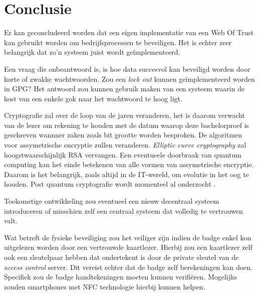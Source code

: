 
\chapter{Conclusie}
\label{ch:conclusie}


Er kan geconcludeerd worden dat een eigen implementatie van een Web Of Trust kan
gebruikt worden om bedrijfsprocessen te beveiligen. Het is echter zeer
belangrijk dat zo'n systeem juist wordt geïmplementeerd.

Een vraag die onbeantwoord is, is hoe data succesvol kan beveiligd worden door
korte of zwakke wachtwoorden. Zou een \textit{lock out} kunnen geïmplementeerd
worden in \gls{GPG}? Het antwoord zou kunnen gebruik maken van een systeem
waarin de kost van een enkele gok naar het wachtwoord te hoog ligt.

Cryptografie zal over de loop van de jaren veranderen, het is daarom verwacht
van de lezer om rekening te houden met de datum waarop deze bachelorproef is
geschreven wannner zaken zoals bit grootte worden besproken. De algoritmen voor
assymetrische encryptie zullen veranderen. \textit{Elliptic curve cryptography}
zal hoogstwaarschijnlijk RSA vervangen. Een eventueele doorbraak van quantum
computing kan het einde betekenen van alle vormen van assymetrische encryptie.
Daarom is het belangrijk, zoals altijd in de IT-wereld, om evolutie in het oog
te houden. Post quantum cryptografie wordt momenteel al onderzocht
\autocite{ANewHopeUsenix}.

Toekomstige ontwikkeling zou eventueel een nieuw decentraal systeem introduceren
of misschien zelf een centraal systeem dat volledig te vertrouwen valt.

Wat betreft de fysieke beveiliging zou het veiliger zijn indien de badge enkel
kon uitgelezen worden door een vertrouwde kaartlezer. Hierbij zou een kaartlezer
zelf ook een sleutelpaar hebben dat ondertekent is door de private sleutel van
de \textit{access control} server. Dit vereist echter dat de badge zelf
berekeningen kan doen. Specifiek zou de badge handtekeningen moeten kunnen
verifiëren. Mogelijks zouden smartphones met NFC technologie hierbij kunnen
helpen.

